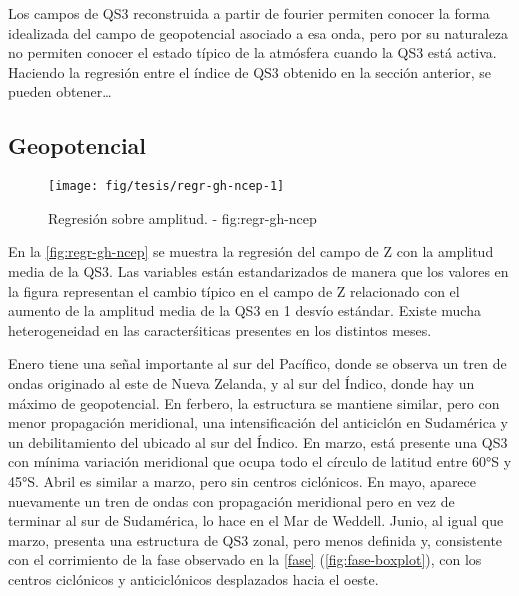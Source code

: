 \documentclass[spanish,a4paper]{book}
\begin{document}
Los campos de QS3 reconstruida a partir de fourier permiten conocer la
forma idealizada del campo de geopotencial asociado a esa onda, pero por
su naturaleza no permiten conocer el estado típico de la atmósfera
cuando la QS3 está activa. Haciendo la regresión entre el índice de QS3
obtenido en la sección anterior, se pueden
obtener\ldots{}

\subsection{Geopotencial}\label{geopotencial}

\begin{landscape}\begin{figure}

{\centering \texttt{[image: fig/tesis/regr-gh-ncep-1]} 

}

\caption{Regresión sobre amplitud. - fig:regr-gh-ncep}\label{fig:regr-gh-ncep}
\end{figure}
\end{landscape}

En la \autoref{fig:regr-gh-ncep} se muestra la regresión del campo de Z
con la amplitud media de la QS3. Las variables están estandarizados de
manera que los valores en la figura representan el cambio típico en el
campo de Z relacionado con el aumento de la amplitud media de la QS3 en
1 desvío estándar. Existe mucha heterogeneidad en las caracterśiticas
presentes en los distintos meses.

Enero tiene una señal importante al sur del Pacífico, donde se observa
un tren de ondas originado al este de Nueva Zelanda, y al sur del
Índico, donde hay un máximo de geopotencial. En ferbero, la estructura
se mantiene similar, pero con menor propagación meridional, una
intensificación del anticiclón en Sudamérica y un debilitamiento del
ubicado al sur del Índico. En marzo, está presente una QS3 con mínima
variación meridional que ocupa todo el círculo de latitud entre 60°S y
45°S. Abril es similar a marzo, pero sin centros ciclónicos. En mayo,
aparece nuevamente un tren de ondas con propagación meridional pero en
vez de terminar al sur de Sudamérica, lo hace en el Mar de Weddell.
Junio, al igual que marzo, presenta una estructura de QS3 zonal, pero
menos definida y, consistente con el corrimiento de la fase observado en
la \autoref{fase} (\autoref{fig:fase-boxplot}), con los centros
ciclónicos y anticiclónicos desplazados hacia el oeste.
\end{document}
